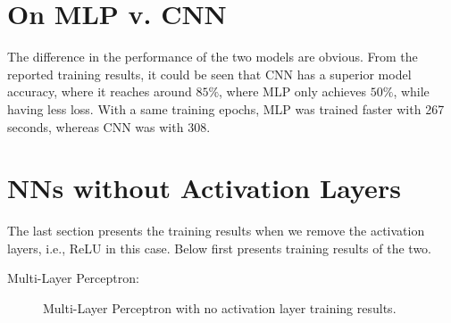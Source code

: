 \documentclass[a4paper,12pt]{article}
\begin{document}
\section*{On MLP v. CNN}
\vspace*{-0.4cm}
The difference in the performance of the two models are obvious.
From the reported training results, it could be seen that CNN has a superior
model accuracy, where it reaches around $85 \%$, where MLP only achieves $50 \%$,
while having less loss.
With a same training epochs, MLP was trained faster with 267 seconds,
whereas CNN was with 308.
\vspace*{-0.6cm}
\section*{NNs without Activation Layers}
\vspace*{-0.4cm}
The last section presents the training results when we remove the activation layers,
i.e., ReLU in this case. Below first presents training results of the two.

Multi-Layer Perceptron:
\begin{figure}[!htb]
   \captionsetup[subfigure]{justification=centering}
   \centering
   \hspace{0.5cm}%
   \caption{Multi-Layer Perceptron with no activation layer training results.}
\end{figure}
\end{document}
